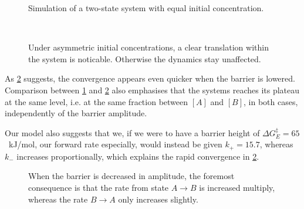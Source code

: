 \documentclass[a4paper,12pt]{article}
\theoremstyle{plain}
\theoremstyle{definition}
\begin{document}
      \begin{figure}[H]
         \vspace*{1cm}
         \hspace*{-2cm}
         \centering
         \begin{minipage}[t]{.6\textwidth}		
            \vspace{0pt}
            \centering
            \resizebox{\columnwidth}{!}{}
            \caption{Simulation of a two-state system with equal initial
            concentration.}
            \label{fig:twostate}
         \end{minipage}~\hspace*{1em}
         \begin{minipage}[t]{.6\textwidth}		
            \vspace{0pt}
            \centering
            \resizebox{\columnwidth}{!}{}
            \caption{Under asymmetric initial concentrations, a clear translation
            within the system is noticable. Otherwise the dynamics stay
            unaffected.}
            \label{fig:twostate_2}
         \end{minipage}
      \end{figure}

      As \cref{fig:twostate_lower_barrier} suggests, the convergence appears
      even quicker when the barrier is lowered. Comparison between
      \cref{fig:twostate_2} and \cref{fig:twostate_lower_barrier} also
      emphasises that the systems reaches its plateau at the same level, i.e. at
      the same fraction between $[A]$ and $[B]$, in both cases, independently of
      the barrier amplitude. 
      
      Our model also suggests that we, if we were to have a barrier height of
      $\Delta G^\ddagger_E = 65$~kJ/mol, our forward rate especially, would instead be given
      $k_+ = 15.7$, whereas $k_-$ increases proportionally, which explains the rapid convergence in
      \cref{fig:twostate_lower_barrier}.

      \begin{figure}[H]
         \centering
         \resizebox{.7\columnwidth}{!}{}
         \caption{When the barrier is decreased in amplitude, the foremost
         consequence is that the rate from state $A \rightarrow B$ is increased
         multiply, whereas the rate $B\rightarrow A$ only increases slightly.}
         \label{fig:twostate_lower_barrier}
      \end{figure}
\end{document}
